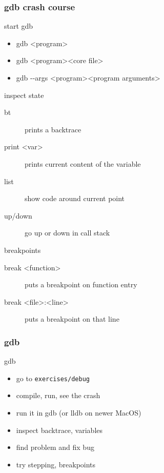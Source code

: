 \begin{frame}[fragile]
  \frametitle{gdb crash course}
  \begin{block}{start gdb}
    \begin{itemize}
    \item gdb \textless{}program\textgreater
    \item gdb \textless{}program\textgreater \textless{}core file\textgreater
    \item gdb -{}-args \textless{}program\textgreater \textless{}program arguments\textgreater
    \end{itemize}
  \end{block}
  \begin{block}{inspect state}
    \begin{description}
    \item[bt] prints a backtrace
    \item[print \textless{}var\textgreater] prints current content of the variable
    \item[list] show code around current point
    \item[up/down] go up or down in call stack
    \end{description}
  \end{block}
  \begin{block}{breakpoints}
    \begin{description}
    \item[break \textless{}function\textgreater] puts a breakpoint on function entry
    \item[break \textless{}file\textgreater:\textless{}line\textgreater] puts a breakpoint on that line
    \end{description}
  \end{block}
\end{frame}

\begin{frame}[fragile]
  \frametitle{gdb}
  \begin{exercise}{gdb}
    \begin{itemize}
    \item go to \texttt{exercises/debug}
    \item compile, run, see the crash
    \item run it in gdb (or lldb on newer MacOS)
    \item inspect backtrace, variables
    \item find problem and fix bug
    \item try stepping, breakpoints
    \end{itemize}
  \end{exercise}
\end{frame}

